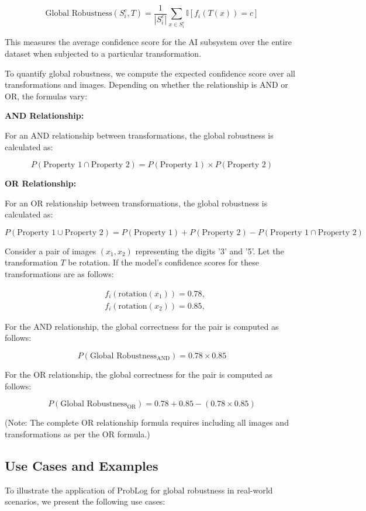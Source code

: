 $$ \text{Global Robustness}(S_i^c, T) = \frac{1}{|S_i^c|} \sum_{x \in S_i^c} \mathbb{I}[f_i(T(x)) = c] $$

This measures the average confidence score for the AI subsystem over the entire dataset when subjected to a particular transformation.

To quantify global robustness, we compute the expected confidence score over all transformations and images. Depending on whether the relationship is AND or OR, the formulas vary:

\textbf{AND Relationship:}

For an AND relationship between transformations, the global robustness is calculated as:

$$ P(\text{Property 1} \cap \text{Property 2}) = P(\text{Property 1}) \times P(\text{Property 2}) $$

\textbf{OR Relationship:}

For an OR relationship between transformations, the global robustness is calculated as:

$$ P(\text{Property 1} \cup \text{Property 2}) = P(\text{Property 1}) + P(\text{Property 2}) - P(\text{Property 1} \cap \text{Property 2}) $$

\begin{example}
Consider a pair of images $(x_1, x_2)$ representing the digits '3' and '5'. Let the transformation $T$ be rotation. If the model's confidence scores for these transformations are as follows:

$$
\begin{aligned}
&f_i(\text{rotation}(x_1)) = 0.78, \\
&f_i(\text{rotation}(x_2)) = 0.85,
\end{aligned}
$$

For the AND relationship, the global correctness for the pair is computed as follows:

$$P(\text{Global Robustness}_{\text{AND}}) = 0.78 \times 0.85$$

For the OR relationship, the global correctness for the pair is computed as follows:

$$P(\text{Global Robustness}_{\text{OR}}) = 0.78 + 0.85 - (0.78 \times 0.85)$$

(Note: The complete OR relationship formula requires including all images and transformations as per the OR formula.)

\end{example}

\subsection{Use Cases and Examples}
To illustrate the application of ProbLog for global robustness in real-world scenarios, we present the following use cases:


